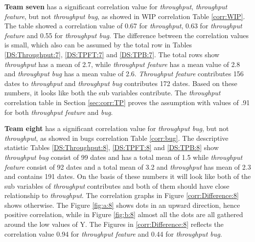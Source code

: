 \documentclass[UKenglish]{ifimaster}  %
\begin{document}
\textbf{Team seven} has a significant correlation value for \textit{throughput}, \textit{throughput feature}, but not \textit{throughput bug}, as showed in WIP correlation Table \ref{corr:WIP}. The table showed a correlation value of 0.67 for \textit{throughput}, 0.63 for \textit{throughput feature} and 0.55 for \textit{throughput bug}. The difference between the correlation values is small, which also can be assumed by the total row in Tables \ref{DS:Throughput:7},  \ref{DS:TPFT:7} and \ref{DS:TPB:7}. The total rows show \textit{throughput} has a mean of 2.7, while \textit{throughput feature} has a mean value of 2.8 and \textit{throughput bug} has a mean value of 2.6. \textit{Throughput feature} contributes 156 dates to \textit{throughput} and \textit{throughput bug} contributes 172 dates. Based on these numbers, it looks like both the sub variables contribute. The \textit{throughput} correlation table in Section \ref{sec:corr:TP} proves the assumption with values of .91 for both \textit{throughput feature} and \textit{bug}.  

\textbf{Team eight} has a significant correlation value for \textit{throughput bug}, but not \textit{throughput}, as showed in bugs correlation Table \ref{corr:bug}. The descriptive statistic Tables \ref{DS:Throughput:8}, \ref{DS:TPFT:8} and \ref{DS:TPB:8} show \textit{throughput bug} consist of 99 dates and has a total mean of 1.5 while \textit{throughput feature} consist of 92 dates and a total mean of 3.2 and \textit{throughput} has mean of 2.3 and contains 191 dates.  On the basis of these numbers it will look like both of the sub variables of \textit{throughput} contributes and both of them should have close relationship to \textit{throughput}.  The correlation graphs in Figure \ref{corr:Difference:8} shows otherwise. The Figure \ref{fig:a:8} shows dots in an upward direction, hence positive correlation, while in Figure \ref{fig:b:8} almost all the dots are all gathered around the low values of Y. The Figures in \ref{corr:Difference:8} reflects the correlation value 0.94 for \textit{throughput feature} and 0.44 for \textit{throughput bug}.
\end{document}

